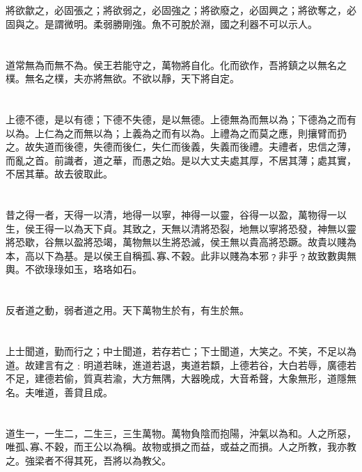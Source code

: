 \documentclass[11pt,oneside]{article}
\begin{document}
\section{}
\label{sec:orgheadline35}
將欲歙之，必固張之；將欲弱之，必固強之；將欲廢之，必固興之；將欲奪之，必固與之。是謂微明。柔弱勝剛強。魚不可脫於淵，國之利器不可以示人。

\section{}
\label{sec:orgheadline36}
道常無為而無不為。侯王若能守之，萬物將自化。化而欲作，吾將鎮之以無名之樸。無名之樸，夫亦將無欲。不欲以靜，天下將自定。

\section{}
\label{sec:orgheadline37}
上德不德，是以有德；下德不失德，是以無德。上德無為而無以為；下德為之而有以為。上仁為之而無以為；上義為之而有以為。上禮為之而莫之應，則攘臂而扔之。故失道而後德，失德而後仁，失仁而後義，失義而後禮。夫禮者，忠信之薄，而亂之首。前識者，道之華，而愚之始。是以大丈夫處其厚，不居其薄；處其實，不居其華。故去彼取此。

\section{}
\label{sec:orgheadline38}
昔之得一者，天得一以清，地得一以寧，神得一以靈，谷得一以盈，萬物得一以生，侯王得一以為天下貞。其致之，天無以清將恐裂，地無以寧將恐發，神無以靈將恐歇，谷無以盈將恐竭，萬物無以生將恐滅，侯王無以貴高將恐蹶。故貴以賤為本，高以下為基。是以侯王自稱孤､寡､不穀。此非以賤為本邪﹖非乎﹖故致數輿無輿。不欲琭琭如玉，珞珞如石。

\section{}
\label{sec:orgheadline39}
反者道之動，弱者道之用。天下萬物生於有，有生於無。

\section{}
\label{sec:orgheadline40}
上士聞道，勤而行之；中士聞道，若存若亡；下士聞道，大笑之。不笑，不足以為道。故建言有之﹕明道若昧，進道若退，夷道若纇，上德若谷，大白若辱，廣德若不足，建德若偷，質真若渝，大方無隅，大器晚成，大音希聲，大象無形，道隱無名。夫唯道，善貸且成。

\section{}
\label{sec:orgheadline41}
道生一，一生二，二生三，三生萬物。萬物負陰而抱陽，沖氣以為和。人之所惡，唯孤､寡､不穀，而王公以為稱。故物或損之而益，或益之而損。人之所教，我亦教之。強梁者不得其死，吾將以為教父。
\end{document}
